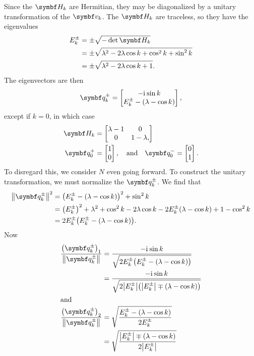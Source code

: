 \documentclass[../thesis.tex]{subfiles}
\begin{document}
Since the $\mq{H}_k$ are Hermitian, they may be diagonalized by a unitary
transformation of the $\vq{v}_k$. The $\mq{H}_k$ are traceless, so they have the
eigenvalues
\begin{align}
  E_k^\pm
  &= \pm\sqrt{-\det\mq{H}_k} \\
  &= \pm\sqrt{\lambda^2 - 2\lambda\cos k + \cos^2 k + \sin^2 k} \\
  &= \pm\sqrt{\lambda^2 - 2\lambda\cos k + 1}.
\end{align}
The eigenvectors are then
\begin{equation}
  \vq{q}_k^\pm
  = \bmqty{%
    -\im\sin k \\
    E_k^\pm - (\lambda - \cos k)
  },
\end{equation}
except if $k = 0$, in which case
\begin{align}
  \mq{H}_k
  &= \bmqty{%
    \lambda - 1 & 0 \\
    0 & 1 - \lambda,
  } \\
  \vq{q}_0^+
  &= \bmqty{1 \\ 0},
  \qand
  \vq{q}_0^-
  = \bmqty{0 \\ 1}.
\end{align}
To disregard this, we consider $N$ even going forward. To construct the unitary
transformation, we must normalize the $\vq{q}_k^\pm$. We find that
\begin{align}
  \norm{\vq{q}_k^\pm}^2
  &= {\qty(E_k^\pm - (\lambda - \cos k))}^2 + \sin^2 k \\
  &= {\qty(E_k^\pm)}^2 + \lambda^2 + \cos^2 k - 2\lambda\cos k - 2E_k^\pm(\lambda - \cos k) + 1 - \cos^2 k \\
  &= 2E_k^\pm \qty(E_k^\pm - (\lambda - \cos k)).
\end{align}
Now
\begin{align}
  \frac{{\qty(\vq{q}_k^\pm)}_1}{\norm{\vq{q}_k^\pm}}
  &= \frac{-\im\sin k}{\sqrt{2E_k^\pm \qty(E_k^\pm - (\lambda - \cos k))}} \\
  &= \frac{-\im\sin k}{\sqrt{2\abs{E_k^\pm} \qty(\abs{E_k^\pm} \mp (\lambda - \cos k))}}
  \\
  \shortintertext{and}
  \frac{{\qty(\vq{q}_k^\pm)}_2}{\norm{\vq{q}_k^\pm}}
  &= \sqrt{\frac{E_k^\pm - (\lambda - \cos k)}{2E_k^\pm}} \\
  &= \sqrt{\frac{\abs{E_k^\pm} \mp (\lambda - \cos k)}{2\abs{E_k^\pm}}}
\end{align}
\end{document}
